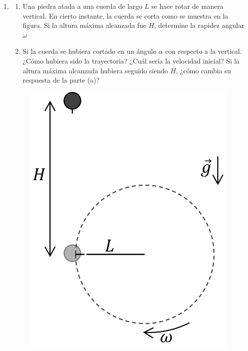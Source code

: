 \documentclass[letterpaper,11pt]{article}
\begin{document}
\begin{enumerate}
\begin{multicols}{2}
\begin{enumerate}
    \item La distancia que separa a las ventanas por las cuales sale e ingresa el proyectil.
    
    \item La rapidez que tiene el proyectil al momento de ingresar por la ventana.
\end{enumerate}

\columnbreak

\begin{figure}[H]
    \centering
    
\end{figure}

\end{multicols}

\item 
\begin{multicols}{2}
    \begin{enumerate}
    
        \item Una piedra atada a una cuerda de largo $L$ se hace rotar de manera vertical. En cierto instante, la cuerda se corta como se muestra en la figura. Si la altura máxima alcanzada fue $H$, determine la rapidez angular $\omega$
    
        
        \item Si la cuerda se hubiera cortado en un ángulo $\alpha$ con respecto a la vertical. ¿Cómo hubiera sido la trayectoria? ¿Cuál sería la velocidad inicial? Si la altura máxima alcanzada hubiera seguido siendo $H$, ¿cómo cambia su respuesta de la parte (a)?
    
    \end{enumerate}

    \columnbreak

    \begin{figure}[H]
        \centering
        \includegraphics[width=0.45\linewidth]{2023-1/img/TD 2/piedra.png}
    \end{figure}
    

\end{multicols}
\end{enumerate}
\end{document}
